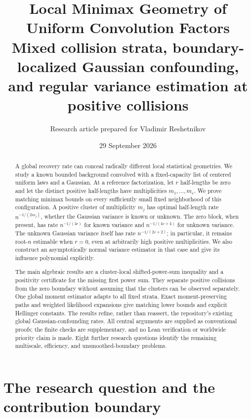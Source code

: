 \documentclass[11pt,a4paper]{article}
\title{\textbf{Local Minimax Geometry of\\Uniform Convolution Factors}\\[0.6em]
\large Mixed collision strata, boundary-localized Gaussian confounding,\\and regular variance estimation at positive collisions}
\author{Research article prepared for Vladimir Reshetnikov}
\date{29 September 2026}
\numberwithin{equation}{section}
\theoremstyle{definition}
\theoremstyle{remark}
\begin{document}
\maketitle
\begin{abstract}
A global recovery rate can conceal radically different local statistical
geometries. We study a known bounded background convolved with a fixed-capacity
list of centered uniform laws and a Gaussian. At a reference factorization,
let $r$ half-lengths be zero and let the distinct positive half-lengths have
multiplicities $m_1,\ldots,m_s$. We prove matching minimax bounds on every
sufficiently small fixed neighborhood of this configuration. A positive cluster
of multiplicity $m_j$ has optimal half-length rate $n^{-1/(2m_j)}$, whether the
Gaussian variance is known or unknown. The zero block, when present, has rate
$n^{-1/(4r)}$ for known variance and $n^{-1/(4r+4)}$ for unknown variance.
The unknown Gaussian variance itself has rate $n^{-1/(2r+2)}$; in particular,
it remains root-$n$ estimable when $r=0$, even at arbitrarily high positive
multiplicities. We also construct an asymptotically normal variance estimator
in that case and give its influence polynomial explicitly.

The main algebraic results are a cluster-local shifted-power-sum inequality
and a positivity certificate for the missing first power sum. They separate
positive collisions from the zero boundary without assuming that the clusters
can be observed separately. One global moment estimator adapts to all fixed
strata. Exact moment-preserving paths and weighted likelihood expansions give
matching lower bounds and explicit Hellinger constants. The results refine,
rather than reassert, the repository's existing global Gaussian-confounding
rates. All central arguments are supplied as conventional proofs; the finite
checks are supplementary, and no Lean verification or worldwide priority
claim is made. Eight further research questions identify the remaining
multiscale, efficiency, and unsmoothed-boundary problems.
\end{abstract}
\newpage
\setcounter{tocdepth}{1}
\tableofcontents
\newpage

\section{The research question and the contribution boundary}
\label{sec:scope}
\end{document}
